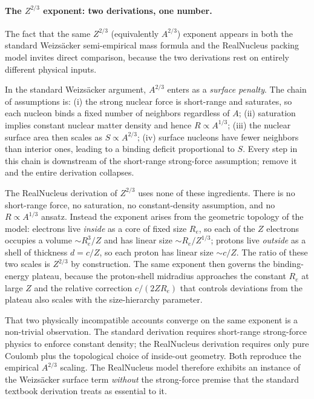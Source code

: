 \documentclass[11pt]{article}
\begin{document}
\paragraph{The $Z^{2/3}$ exponent: two derivations, one number.}
The fact that the same $Z^{2/3}$ (equivalently $A^{2/3}$) exponent appears in both the standard Weizsäcker semi-empirical mass formula and the RealNucleus packing model invites direct comparison, because the two derivations rest on entirely different physical inputs.

In the standard Weizsäcker argument, $A^{2/3}$ enters as a \emph{surface penalty}. The chain of assumptions is: (i) the strong nuclear force is short-range and saturates, so each nucleon binds a fixed number of neighbors regardless of $A$; (ii) saturation implies constant nuclear matter density and hence $R \propto A^{1/3}$; (iii) the nuclear surface area then scales as $S \propto A^{2/3}$; (iv) surface nucleons have fewer neighbors than interior ones, leading to a binding deficit proportional to $S$. Every step in this chain is downstream of the short-range strong-force assumption; remove it and the entire derivation collapses.

The RealNucleus derivation of $Z^{2/3}$ uses none of these ingredients. There is no short-range force, no saturation, no constant-density assumption, and no $R \propto A^{1/3}$ ansatz. Instead the exponent arises from the geometric topology of the model: electrons live \emph{inside} as a core of fixed size $R_e$, so each of the $Z$ electrons occupies a volume $\sim R_e^3 / Z$ and has linear size $\sim R_e / Z^{1/3}$; protons live \emph{outside} as a shell of thickness $d = c/Z$, so each proton has linear size $\sim c/Z$. The ratio of these two scales is $Z^{2/3}$ by construction. The same exponent then governs the binding-energy plateau, because the proton-shell midradius approaches the constant $R_e$ at large $Z$ and the relative correction $c/(2Z R_e)$ that controls deviations from the plateau also scales with the size-hierarchy parameter.

That two physically incompatible accounts converge on the same exponent is a non-trivial observation. The standard derivation requires short-range strong-force physics to enforce constant density; the RealNucleus derivation requires only pure Coulomb plus the topological choice of inside-out geometry. Both reproduce the empirical $A^{2/3}$ scaling. The RealNucleus model therefore exhibits an instance of the Weizsäcker surface term \emph{without} the strong-force premise that the standard textbook derivation treats as essential to it.
\end{document}
